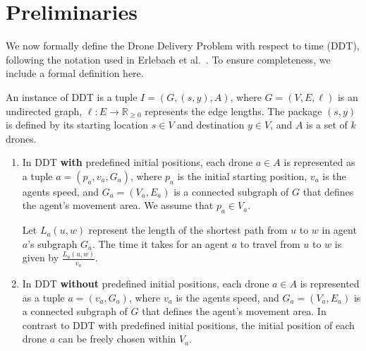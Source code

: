 \section{Preliminaries}

We now formally define the Drone Delivery Problem with respect to time (DDT), following the notation used in Erlebach et al.~\cite{erlebach:drones}. To ensure completeness, we include a formal definition here.

 An instance of DDT is a tuple $I = (G, (s, y), A)$, where $G = (V, E, \ell)$ is an undirected graph, $\ell: E \rightarrow \mathbb{R}_{\geq 0}$ represents the edge lengths. The package  $(s, y)$ is defined by its starting location $s\in V$ and destination  $y\in V$, and $A$ is a set of $k$ drones.   
    \begin{enumerate}
    \item In DDT \textbf{with} predefined
initial positions, each drone $a \in A$ is represented as a tuple $a=(p_a,v_a,G_a)$, where $p_a$ is the initial starting position, $v_a$ is the agents speed, and $G_a=(V_a, E_a)$ is a connected subgraph of $G$ that defines the agent's movement area.  We assume that $p_a\in V_a$.  

Let $L_a(u, w)$ represent the length of the shortest path from $u$ to $w$ in agent $a$'s subgraph $G_a$. The time it takes for an agent $a$ to travel from $u$ to $w$ is given by  $\frac{L_a(u, w)}{v_a}$. 

    \item In DDT \textbf{without} predefined
initial positions, each drone $a \in A$ is represented as a tuple $a=(v_a,G_a)$, where  $v_a$ is the agents speed, and $G_a=(V_a, E_a)$ is a connected subgraph of $G$ that defines the agent's movement area. In contrast to DDT with predefined
initial positions, the initial position of each drone $a$ can be freely chosen within $V_a$.%
    \end{enumerate}



